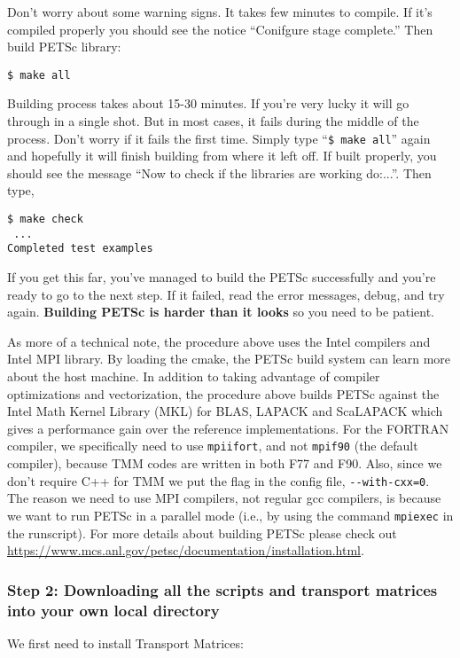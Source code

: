 \documentclass[a4paper]{article}
\def\noin{\noindent }
\begin{document}
\noin Don't worry about some warning signs. It takes few minutes to compile. If it's compiled properly you should see the notice ``Conifgure stage complete.'' Then build PETSc library:
\begin{lstlisting}[style=DOS]
 $ make all
\end{lstlisting}
Building process takes about 15-30 minutes. If you're very lucky it will go through in a single shot. But in most cases, it fails during the middle of the process. Don't worry if it fails the first time. Simply type ``\verb/$ make all/'' again and hopefully it will finish building from where it left off. If built properly, you should see the message ``Now to check if the libraries are working do:...''. Then type,
\begin{lstlisting}[style=DOS]
 $ make check
 ...
Completed test examples
\end{lstlisting}
If you get this far, you've managed to build the PETSc successfully and you're ready to go to the next step. If it failed, read the error messages, debug, and try again. \textbf{Building PETSc is harder than it looks} so you need to be patient. 

\vspace{5mm}
\noin As more of a technical note, the procedure above uses the Intel compilers and Intel MPI library. By loading the cmake, the PETSc build system can learn more about the host machine. In addition to taking advantage of compiler optimizations and vectorization, the procedure above builds PETSc against the Intel Math Kernel Library (MKL) for BLAS, LAPACK and ScaLAPACK which gives a performance gain over the reference implementations. For the FORTRAN compiler, we specifically need to use \verb/mpiifort/, and not \verb/mpif90/ (the default compiler), because TMM codes are written in both F77 and F90. Also, since we don't require C++ for TMM we put the flag in the config file, \verb/--with-cxx=0/. The reason we need to use MPI compilers, not regular gcc compilers, is because we want to run PETSc in a parallel mode (i.e., by using the command \verb/mpiexec/ in the runscript). For more details about building PETSc please check out \url{https://www.mcs.anl.gov/petsc/documentation/installation.html}. 

\subsubsection{Step 2: Downloading all the scripts and transport matrices into your own local directory}
We first need to install Transport Matrices:
\end{document}
